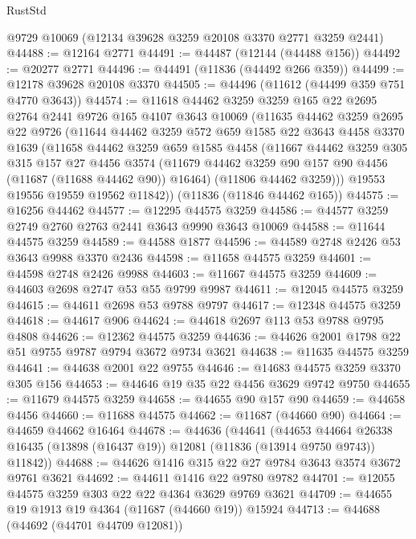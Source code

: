\begin{lexlean}{RustStd}
\begin{coremodule}
    @9729
    @10069
    (@12134 @39628 @3259 @20108 @3370 @2771 @3259 @2441)
@44488 := @12164 @2771
@44491 := @44487 (@12144 (@44488 @156))
@44492 := @20277 @2771
@44496 := @44491 (@11836 (@44492 @266 @359))
@44499 := @12178 @39628 @20108 @3370
@44505 := @44496 (@11612 (@44499 @359 @751 @4770 @3643))
@44574 := @11618
    @44462
    @3259
    @3259
    @165
    @22
    @2695
    @2764
    @2441
    @9726
    @165
    @4107
    @3643
    @10069
    (@11635
      @44462
      @3259
      @2695
      @22
      @9726
      (@11644
        @44462
        @3259
        @572
        @659
        @1585
        @22
        @3643
        @4458
        @3370
        @1639
        (@11658
          @44462
          @3259
          @659
          @1585
          @4458
          (@11667
            @44462
            @3259
            @305
            @315
            @157
            @27
            @4456
            @3574
            (@11679 @44462 @3259 @90 @157 @90 @4456 (@11687 (@11688 @44462 @90)) @16464)
            (@11806 @44462 @3259)))
        @19553
        @19556
        @19559
        @19562
        @11842))
    (@11836 (@11846 @44462 @165))
@44575 := @16256 @44462
@44577 := @12295 @44575 @3259
@44586 := @44577 @3259 @2749 @2760 @2763 @2441 @3643 @9990 @3643 @10069
@44588 := @11644 @44575 @3259
@44589 := @44588 @1877
@44596 := @44589 @2748 @2426 @53 @3643 @9988 @3370 @2436
@44598 := @11658 @44575 @3259
@44601 := @44598 @2748 @2426 @9988
@44603 := @11667 @44575 @3259
@44609 := @44603 @2698 @2747 @53 @55 @9799 @9987
@44611 := @12045 @44575 @3259
@44615 := @44611 @2698 @53 @9788 @9797
@44617 := @12348 @44575 @3259
@44618 := @44617 @906
@44624 := @44618 @2697 @113 @53 @9788 @9795 @4808
@44626 := @12362 @44575 @3259
@44636 := @44626 @2001 @1798 @22 @51 @9755 @9787 @9794 @3672 @9734 @3621
@44638 := @11635 @44575 @3259
@44641 := @44638 @2001 @22 @9755
@44646 := @14683 @44575 @3259 @3370 @305 @156
@44653 := @44646 @19 @35 @22 @4456 @3629 @9742 @9750
@44655 := @11679 @44575 @3259
@44658 := @44655 @90 @157 @90
@44659 := @44658 @4456
@44660 := @11688 @44575
@44662 := @11687 (@44660 @90)
@44664 := @44659 @44662 @16464
@44678 := @44636
    (@44641
      (@44653
        @44664
        @26338
        @16435
        (@13898 (@16437 @19))
        @12081
        (@11836 (@13914 @9750 @9743))
        @11842))
@44688 := @44626 @1416 @315 @22 @27 @9784 @3643 @3574 @3672 @9761 @3621
@44692 := @44611 @1416 @22 @9780 @9782
@44701 := @12055 @44575 @3259 @303 @22 @22 @4364 @3629 @9769 @3621
@44709 := @44655 @19 @1913 @19 @4364 (@11687 (@44660 @19)) @15924
@44713 := @44688 (@44692 (@44701 @44709 @12081))

\end{coremodule}
\end{lexlean}
